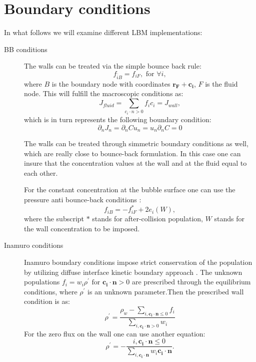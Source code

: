 \documentclass{article}
\begin{document}
\appendix

\section{Boundary conditions}
In what follows we will examine different LBM implementations:
\begin{description}
 \item[BB conditions] The walls can be treated via the simple bounce back rule:
\begin{equation}
f_{\bar{i}B}=f_{iF},\text{ for } \forall i,
\end{equation}
where $B$ is the boundary node with coordinates $\bm{r_F}+\bm{c_i}$, $F$ is the fluid node. This
will fulfill the macroscopic conditions as:
\begin{equation}
J_{fluid}= \sum_{c_i\cdot n>0}{f_i c_i}=J_{wall},
\end{equation}
which is in turn represents the following boundary condition:
\begin{equation}
\partial_n J_n=\partial_n C u_n = u_n \partial_n C=0
\end{equation}

The walls can be treated through simmetric boundary conditions as well, which are really close to
bounce-back formulation. In this case one can insure that the concentration values at the wall and
at the fluid equal to each other. 

For the constant concentration at the bubble surface one can use the pressure anti
bounce-back conditions
\cite{ginzburg-boundary-main}:
\begin{equation}
f_{iB}=-f^{*}_{iF}+2 e_i(W),
\end{equation}
where the subscript $*$ stands for after-collision population, $W$ stands for the wall
concentration to be imposed.
\item[Inamuro conditions] Inamuro boundary conditions impose strict conservation of the population
by utilizing diffuse interface kinetic boundary approach \cite{inamuro-scalar-boundary}. The
unknown populations $f_i=w_i \rho^{\prime}\text{ for } \bm{c_i}\cdot \bm{n}>0$ are prescribed
through the equilibrium conditions, where $\rho^{\prime}$ is an unknown parameter.Then the
prescribed wall condition is as: 
\begin{equation}
\rho^{\prime}=\frac{\rho_{w}-\sum_{i,\bm{c_i}\cdot\bm{n}\leq0}
f_i}{\sum_{i,\bm{c_i}\cdot\bm{n}>0}w_i}
\end{equation}
For the zero flux on the wall one can use another equation:
\begin{equation}
\rho^{\prime}=-\frac{i,\bm{c_i}\cdot\bm{n}\leq0}{\sum_{i,\bm{c_i}\cdot \bm{n}}{w_i \bm{c_i}\cdot
\bm{n}}}.
\end{equation}
\end{description}
\end{document}

